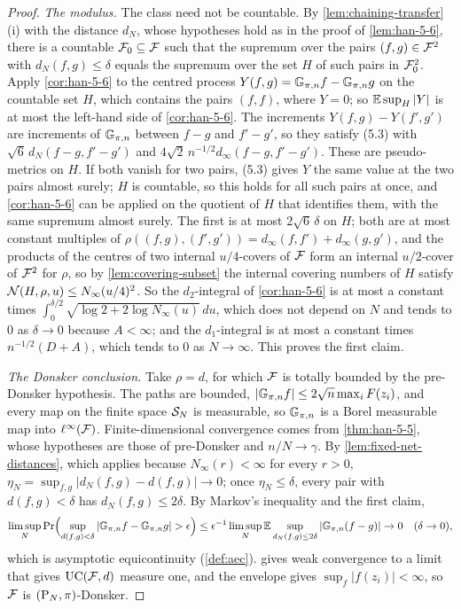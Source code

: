 \begin{proof}
  \emph{The modulus.} The class need not be countable. By \cref{lem:chaining-transfer}(i) with the distance $d_N$, whose hypotheses hold as in the proof of \cref{lem:han-5-6}, there is a countable $\mathcal{F}_0\subseteq\mathcal{F}$ such that the supremum over the pairs $(f,g)\in\mathcal{F}^2$ with $d_N(f,g)\le\delta$ equals the supremum over the set $H$ of such pairs in $\mathcal{F}_0^2$. Apply \cref{cor:han-5-6} to the centred process $Y(f,g)=\mathbb{G}_{\pi,n} f-\mathbb{G}_{\pi,n} g$ on the countable set $H$, which contains the pairs $(f,f)$, where $Y=0$; so $\mathbb{E}\sup_H|Y|$ is at most the left-hand side of \cref{cor:han-5-6}. The increments $Y(f,g)-Y(f',g')$ are increments of $\mathbb{G}_{\pi,n}$ between $f-g$ and $f'-g'$, so they satisfy (5.3) with $\sqrt6\,d_N(f-g,f'-g')$ and $4\sqrt2\,n^{-1/2}d_\infty(f-g,f'-g')$. These are pseudo-metrics on $H$. If both vanish for two pairs, (5.3) gives $Y$ the same value at the two pairs almost surely; $H$ is countable, so this holds for all such pairs at once, and \cref{cor:han-5-6} can be applied on the quotient of $H$ that identifies them, with the same supremum almost surely. The first is at most $2\sqrt6\,\delta$ on $H$; both are at most constant multiples of $\rho((f,g),(f',g'))=d_\infty(f,f')+d_\infty(g,g')$, and the products of the centres of two internal $u/4$-covers of $\mathcal{F}$ form an internal $u/2$-cover of $\mathcal{F}^2$ for $\rho$, so by \cref{lem:covering-subset} the internal covering numbers of $H$ satisfy $\mathcal{N}(H,\rho,u)\le N_\infty(u/4)^2$. So the $d_2$-integral of \cref{cor:han-5-6} is at most a constant times $\int_0^{\delta/2}\sqrt{\log2+2\log N_\infty(u)}\,du$, which does not depend on $N$ and tends to $0$ as $\delta\to0$ because $A<\infty$; and the $d_1$-integral is at most a constant times $n^{-1/2}(D+A)$, which tends to $0$ as $N\to\infty$. This proves the first claim.

  \emph{The Donsker conclusion.} Take $\rho=d$, for which $\mathcal{F}$ is totally bounded by the pre-Donsker hypothesis. The paths are bounded, $|\mathbb{G}_{\pi,n} f|\le2\sqrt n\max_iF(z_i)$, and every map on the finite space $\mathcal{S}_N$ is measurable, so $\mathbb{G}_{\pi,n}$ is a Borel measurable map into $\ell^\infty(\mathcal{F})$. Finite-dimensional convergence comes from \cref{thm:han-5-5}, whose hypotheses are those of pre-Donsker and $n/N\to\gamma$. By \cref{lem:fixed-net-distances}, which applies because $N_\infty(r)<\infty$ for every $r>0$, $\eta_N=\sup_{f,g}|d_N(f,g)-d(f,g)|\to0$; once $\eta_N\le\delta$, every pair with $d(f,g)<\delta$ has $d_N(f,g)\le2\delta$. By Markov's inequality and the first claim,
  \[
    \limsup_N\Pr\Bigl(\sup_{d(f,g)<\delta}|\Gpin f-\Gpin g|>\epsilon\Bigr)\le\epsilon^{-1}\limsup_N\E\sup_{d_N(f,g)\le2\delta}|\Gpin(f-g)|\to0\quad(\delta\to0),
  \]
  which is asymptotic equicontinuity (\cref{def:aec}).  gives weak convergence to a limit that gives $\mathrm{UC}(\mathcal{F},d)$ measure one, and the envelope gives $\sup_f|f(z_i)|<\infty$, so $\mathcal{F}$ is $(\mathrm{P}_N,\pi)$-Donsker.
\end{proof}

